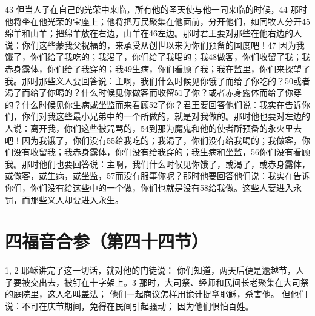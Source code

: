 43 但当人子在自己的光荣中来临，所有他的圣天使与他一同来临的时候，44 那时他将坐在他光荣的宝座上；他将把万民聚集在他面前，分开他们，如同牧人分开45绵羊和山羊；把绵羊放在右边，山羊在46左边。那时君王要对那些在他右边的人说：你们这些蒙我父祝福的，来承受从创世以来为你们预备的国度吧！47 因为我饿了，你们给了我吃的；我渴了，你们给了我喝的；我48做客，你们收留了我；我赤身露体，你们给了我穿的；我49生病，你们看顾了我；我在监里，你们来探望了我。那时那些义人要回答说：主啊，我们什么时候见你饿了而给了你吃的？50或者渴了而给了你喝的？什么时候见你做客而收留51了你？或者赤身露体而给了你穿的？什么时候见你生病或坐监而来看顾52了你？君王要回答他们说：我实在告诉你们，你们对我这些最小兄弟中的一个所做的，就是对我做的。那时他也要对左边的人说：离开我，你们这些被咒骂的，54到那为魔鬼和他的使者所预备的永火里去吧！因为我饿了，你们没有55给我吃的；我渴了，你们没有给我喝的；我做客，你们没有收留我；我赤身露体，你们没有给我穿的；我生病和坐监，56你们没有看顾我。那时他们也要回答说：主啊，我们什么时候见你饿了，或渴了，或赤身露体，或做客，或生病，或坐监，57而没有服事你呢？那时他要回答他们说：我实在告诉你们，你们没有给这些中的一个做，你们也就是没有58给我做。这些人要进入永罚，而那些义人却要进入永生。\par



\section{四福音合参（第四十四节）}

1, 2  耶稣讲完了这一切话，就对他的门徒说： 你们知道，两天后便是逾越节，人子要被交出去，被钉在十字架上。3  那时，大司祭、经师和民间长老聚集在大司祭的庭院里，这人名叫盖法； 他们一起商议怎样用诡计捉拿耶稣，杀害他。 但他们说：不可在庆节期间，免得在民间引起骚动； 因为他们惧怕百姓。\par

